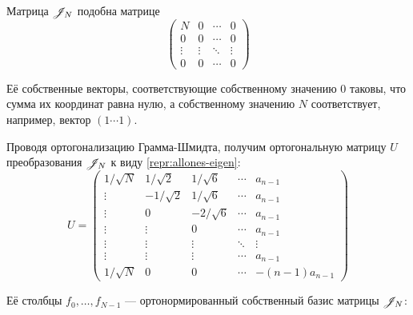 \begin{lemma}
    Матрица \( \mathscr{J}_{N} \) подобна матрице
    \begin{equation}\label{repr:allones-eigen}
        \begin{pmatrix}
            N       & 0      & \cdots & 0 \\
            0       & 0      & \cdots & 0 \\
            \vdots  & \vdots & \ddots & \vdots  \\
            0       & 0      & \cdots & 0
        \end{pmatrix}
    \end{equation}

    Её собственные векторы, соответствующие собственному значению \( 0 \)
    таковы, что сумма их координат равна нулю,
    а собственному значению \( N \) соответствует, например,
    вектор \( \left(1\cdots 1\right) \).

    Проводя ортогонализацию Грамма-Шмидта,
    получим ортогональную матрицу \( U \) преобразования \( \mathscr{J}_{N} \)
    к виду \eqref{repr:allones-eigen}:
    \begin{equation}\label{eq:diagtransform}
    U =
    \begin{pmatrix}
        1/\sqrt N &  1/\sqrt2 & 1/\sqrt6   & \cdots & a_{n-1} \\
        \vdots    & -1/\sqrt2 & 1/\sqrt6   & \cdots & a_{n-1} \\
        \vdots    & 0         & -2/\sqrt6  & \cdots & a_{n-1} \\
        \vdots    & \vdots    & 0          & \cdots & a_{n-1} \\
        \vdots    & \vdots    & \vdots     & \ddots & \vdots  \\
        \vdots    & \vdots    & \vdots     & \cdots & a_{n-1} \\
        1/\sqrt N & 0         & 0          & \cdots & -(n-1)a_{n-1}
        \end{pmatrix}
        \end{equation}

        \begin{minipage}{0.9\textwidth}
            Её столбцы \( f_0, \ldots, f_{N-1} \)
            --- ортонормированный собственный базис матрицы \( \mathscr{J}_{N} \):


\end{minipage}
\end{lemma}
